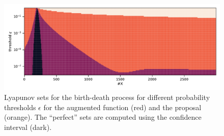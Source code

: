 \begin{figure}[htb]
\centering
\includegraphics[width=\textwidth]{gfx/lya_sets.pdf}
	\caption[Augmented v.\ proposal Lyapunov sets]{\label{fig:lya_sets}Lyapunov sets for the birth-death process for different probability thresholds $\epsilon$ for the augmented function (red) and the proposal (orange). The ``perfect'' sets are computed using the confidence interval (dark).}
\end{figure}
\begin{figure}[htb]
	\centering
	\caption{\label{fig:improvement}}
\end{figure}



